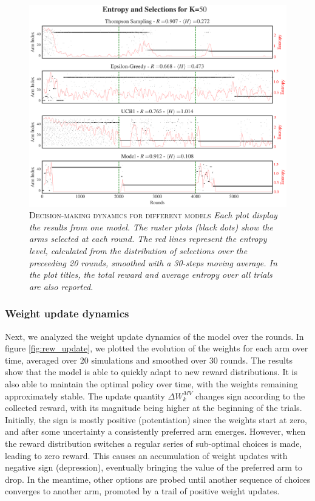 \begin{figure}[H]
    \centering
    \includegraphics[width=1.0\textwidth]{figures/performance_analysis_KABv0.png}
    \caption{\textsc{Decision-making dynamics for different models} \textit{Each plot display the results from one model.
The raster plots (black dots) show the arms selected at each round.
The red lines represent the entropy level, calculated from the distribution of selections over the preceeding 20 rounds, smoothed with a 30-steps moving average. In the plot titles, the total reward and average entropy over all trials are also reported.}}
    \label{fig:entropy_fig1}
\end{figure}


\subsubsection{Weight update dynamics}
\noindent Next, we analyzed the weight update dynamics of the model over the rounds.
In figure \ref{fig:rew_update}, we plotted the evolution of the weights for each arm over time, averaged over 20 simulations and smoothed over 30 rounds.
The results show that the model is able to quickly adapt to new reward distributions. It is also able to maintain the optimal policy over time, with the weights remaining approximately stable.
The update quantity $\Delta W_{k}^{MV}$ changes sign according to the collected reward, with its magnitude being higher at the beginning of the trials.
Initially, the sign is mostly positive (potentiation) since the weights start at zero, and after some uncertainty a consistently preferred arm emerges.
However, when the reward distribution switches a regular series of sub-optimal choices is made, leading to zero reward.
This causes an accumulation of weight updates with negative sign (depression), eventually bringing the value of the preferred arm to drop. In the meantime, other options are probed until another sequence of choices converges to another arm, promoted by a trail of positive weight updates.


